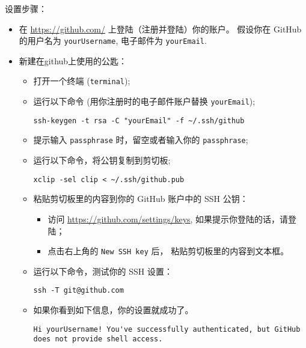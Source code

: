 \documentclass[
    11pt,
    base=hide,
    cite=authoryear,
    device=phone,
    lang=cn,
    mode=simple,
    result=answer,
    toc=onecol,
]{elegantsierxue310}
\begin{document}
设置步骤：
\begin{itemize}
    \item 在 \href{https://github.com/}{https://github.com/}
        上登陆（注册并登陆）你的账户。
        假设你在 GitHub 的用户名为 \lstinline{yourUsername},
        电子邮件为 \lstinline{yourEmail}.
    \item 新建在github上使用的公匙：
        \begin{itemize}
            \item 打开一个终端 (\lstinline{terminal});
            \item 运行以下命令 (用你注册时的电子邮件账户替换
                \lstinline{yourEmail});
\begin{lstlisting}[style=lst-right]
ssh-keygen -t rsa -C "yourEmail" -f ~/.ssh/github
\end{lstlisting}
            \item 提示输入 \lstinline{passphrase}
                时，留空或者输入你的 \lstinline{passphrase};
            \item 运行以下命令，将公钥复制到剪切板;
\begin{lstlisting}[style=lst-right]
xclip -sel clip < ~/.ssh/github.pub
\end{lstlisting}
            \item 粘贴剪切板里的内容到你的 GitHub 账户中的 SSH 公钥：
                \begin{itemize}
                    \item 访问 \href{https://github.com/settings/keys}
                        {https://github.com/settings/keys},
                        如果提示你登陆的话，请登陆；
                    \item 点击右上角的 \lstinline{New SSH key} 后，
                        粘贴剪切板里的内容到文本框。
                \end{itemize}
            \item 运行以下命令，测试你的 SSH 设置：
\begin{lstlisting}[style=lst-right]
ssh -T git@github.com
\end{lstlisting}
            \item 如果你看到如下信息，你的设置就成功了。
\begin{lstlisting}[style=lst-right]
Hi yourUsername! You've successfully authenticated, but GitHub does not provide shell access.
\end{lstlisting}
        \end{itemize}
\end{itemize}
\end{document}

